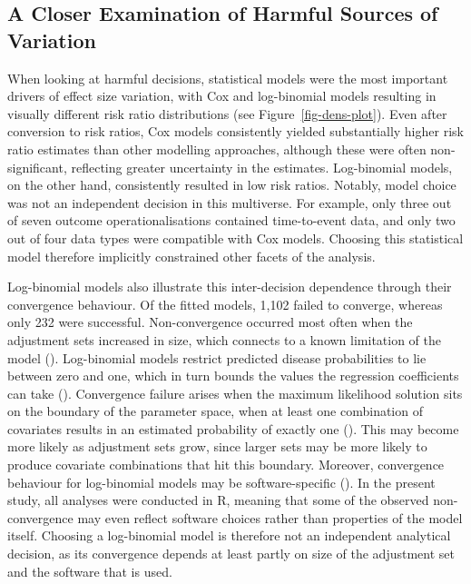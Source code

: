 \documentclass[
  man,
  floatsintext,
  longtable,
  nolmodern,
  notxfonts,
  notimes,
  colorlinks=true,linkcolor=blue,citecolor=blue,urlcolor=blue]{apa7}
\begin{document}
\newpage

\subsection{A Closer Examination of Harmful Sources of
Variation}\label{a-closer-examination-of-harmful-sources-of-variation}

When looking at harmful decisions, statistical models were the most
important drivers of effect size variation, with Cox and log-binomial
models resulting in visually different risk ratio distributions (see
Figure~\ref{fig-dens-plot}). Even after conversion to risk ratios, Cox
models consistently yielded substantially higher risk ratio estimates
than other modelling approaches, although these were often
non-significant, reflecting greater uncertainty in the estimates.
Log-binomial models, on the other hand, consistently resulted in low
risk ratios. Notably, model choice was not an independent decision in
this multiverse. For example, only three out of seven outcome
operationalisations contained time-to-event data, and only two out of
four data types were compatible with Cox models. Choosing this
statistical model therefore implicitly constrained other facets of the
analysis.

Log-binomial models also illustrate this inter-decision dependence
through their convergence behaviour. Of the fitted models, 1,102 failed
to converge, whereas only 232 were successful. Non-convergence occurred
most often when the adjustment sets increased in size, which connects to
a known limitation of the model (). Log-binomial models restrict predicted disease
probabilities to lie between zero and one, which in turn bounds the
values the regression coefficients can take
().
Convergence failure arises when the maximum likelihood solution sits on
the boundary of the parameter space, when at least one combination of
covariates results in an estimated probability of exactly one
(). This may become
more likely as adjustment sets grow, since larger sets may be more
likely to produce covariate combinations that hit this boundary.
Moreover, convergence behaviour for log-binomial models may be
software-specific
().
In the present study, all analyses were conducted in R, meaning that
some of the observed non-convergence may even reflect software choices
rather than properties of the model itself. Choosing a log-binomial
model is therefore not an independent analytical decision, as its
convergence depends at least partly on size of the adjustment set and
the software that is used.
\end{document}
